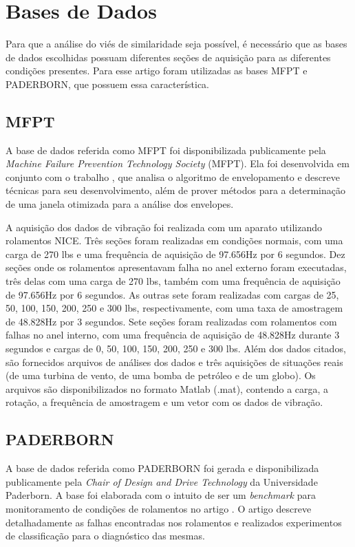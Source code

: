 \documentclass[conference]{IEEEtran}
\begin{document}
\section{Bases de Dados}

Para que a análise do viés de similaridade seja possível, é necessário que as bases de dados escolhidas possuam diferentes seções de aquisição para as diferentes condições presentes.
Para esse artigo foram utilizadas as bases MFPT e PADERBORN, que possuem essa característica.

\subsection{MFPT}

A base de dados referida como MFPT foi disponibilizada publicamente pela \textit{Machine Failure Prevention Technology Society} (MFPT).
Ela foi desenvolvida em conjunto com o trabalho \cite{b13}, que analisa o algoritmo de envelopamento e descreve técnicas para seu desenvolvimento, além de prover métodos para a determinação de uma janela otimizada para a análise dos envelopes.

A aquisição dos dados de vibração foi realizada com um aparato utilizando rolamentos NICE.
Três seções foram realizadas em condições normais, com uma carga de 270 lbs e uma frequência de aquisição de 97.656Hz por 6 segundos.
Dez seções onde os rolamentos apresentavam falha no anel externo foram executadas, três delas com uma carga de 270 lbs, também com uma frequência de aquisição de 97.656Hz por 6 segundos.
As outras sete foram realizadas com cargas de 25, 50, 100, 150, 200, 250 e 300 lbs, respectivamente, com uma taxa de amostragem de 48.828Hz por 3 segundos.
Sete seções foram realizadas com rolamentos com falhas no anel interno, com uma frequência de aquisição de 48.828Hz durante 3 segundos e cargas de 0, 50, 100, 150, 200, 250 e 300 lbs.
Além dos dados citados, são fornecidos arquivos de análises dos dados e três aquisições de situações reais (de uma turbina de vento, de uma bomba de petróleo e de um globo).
Os arquivos são disponibilizados no formato Matlab (.mat), contendo a carga, a rotação, a frequência de amostragem e um vetor com os dados de vibração.

\subsection{PADERBORN}

A base de dados referida como PADERBORN foi gerada e disponibilizada publicamente pela \textit{Chair of Design and Drive Technology} da Universidade Paderborn.
A base foi elaborada com o intuito de ser um \textit{benchmark} para monitoramento de condições de rolamentos no artigo \cite{b14}.
O artigo descreve detalhadamente as falhas encontradas nos rolamentos e realizados experimentos de classificação para o diagnóstico das mesmas.
\end{document}
